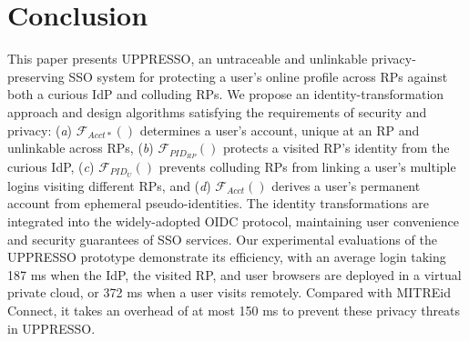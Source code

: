 \section{Conclusion}
\label{sec:conclusion}
This paper presents UPPRESSO, an untraceable and unlinkable privacy-preserving SSO system for protecting a user's online profile across RPs against both a curious IdP and colluding RPs.
We propose an identity-transformation approach and design algorithms satisfying the requirements of security and privacy: (\emph{a}) $\mathcal{F}_{Acct\ast}()$ determines a user's account, unique at an RP and unlinkable across RPs,
(\emph{b}) $\mathcal{F}_{PID_{RP}}()$ protects a visited RP's identity from the curious IdP, (\emph{c}) $\mathcal{F}_{PID_{U}}()$ prevents colluding RPs from linking a user's multiple logins visiting different RPs, and (\emph{d}) $\mathcal{F}_{Acct}()$ derives a user's permanent account from ephemeral pseudo-identities.
The identity transformations are integrated into the widely-adopted OIDC protocol, maintaining user convenience and security guarantees of SSO services. Our experimental evaluations of the UPPRESSO prototype demonstrate its efficiency,
        with an average login taking 187 ms when the IdP, the visited RP, and user browsers are deployed in a virtual private cloud, or 372 ms when a user visits remotely.
Compared with MITREid Connect,
it takes an overhead of at most 150 ms to prevent these privacy threats in UPPRESSO.



\newpage 